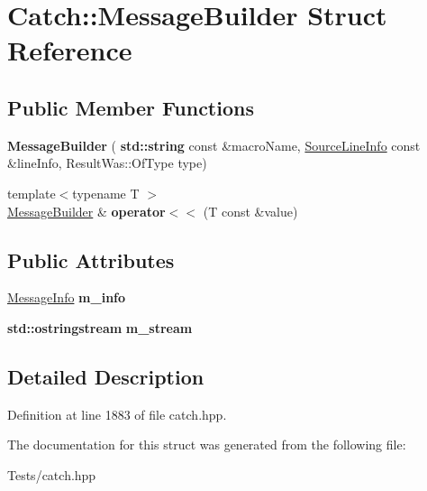 \hypertarget{struct_catch_1_1_message_builder}{}\section{Catch\+:\+:Message\+Builder Struct Reference}
\label{struct_catch_1_1_message_builder}
\subsection*{Public Member Functions}
\begin{DoxyCompactItemize}
\item 
\mbox{\label{struct_catch_1_1_message_builder_ab0c6378e722680bf58852c6ee2b6e724}} 
{\bfseries Message\+Builder} (\textbf{ std\+::string} const \&macro\+Name, \hyperlink{struct_catch_1_1_source_line_info}{Source\+Line\+Info} const \&line\+Info, Result\+Was\+::\+Of\+Type type)
\item 
\mbox{\label{struct_catch_1_1_message_builder_a20fa48d069b20dddcc2d3df8abb123c1}} 
{\footnotesize template$<$typename T $>$ }\\\hyperlink{struct_catch_1_1_message_builder}{Message\+Builder} \& {\bfseries operator$<$$<$} (T const \&value)
\end{DoxyCompactItemize}
\subsection*{Public Attributes}
\begin{DoxyCompactItemize}
\item 
\mbox{\label{struct_catch_1_1_message_builder_a979f1c2b36d78f80ee275bfa5ba0209f}} 
\hyperlink{struct_catch_1_1_message_info}{Message\+Info} {\bfseries m\+\_\+info}
\item 
\mbox{\label{struct_catch_1_1_message_builder_a6488ab0cc4ea52affc9c0612c7c5df6b}} 
\textbf{ std\+::ostringstream} {\bfseries m\+\_\+stream}
\end{DoxyCompactItemize}


\subsection{Detailed Description}


Definition at line 1883 of file catch.\+hpp.



The documentation for this struct was generated from the following file\+:\begin{DoxyCompactItemize}
\item 
Tests/catch.\+hpp\end{DoxyCompactItemize}
